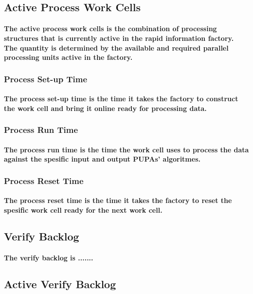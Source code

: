 \documentclass{acm_proc_article-sp}
\begin{document}
\subsection{Active Process Work Cells}
\paragraph{The active process work cells is the combination of processing structures that is currently active in the rapid information factory. The quantity is determined by the available and required parallel processing units active in the factory.}
\subsubsection{Process Set-up Time}
\paragraph{The process set-up time is the time it takes the factory to construct the work cell and bring it online ready for processing data.}
\subsubsection{Process Run Time}
\paragraph{The process run time is the time the work cell uses to process the data against the spesific input and output PUPAs' algoritmes.}
\subsubsection{Process Reset Time}
\paragraph{The process reset time is the time it takes the factory to reset the spesific work cell ready for the next work cell.}
\subsection{Verify Backlog}
\paragraph{The verify backlog is .......}
\subsection{Active Verify Backlog}
\end{document}
